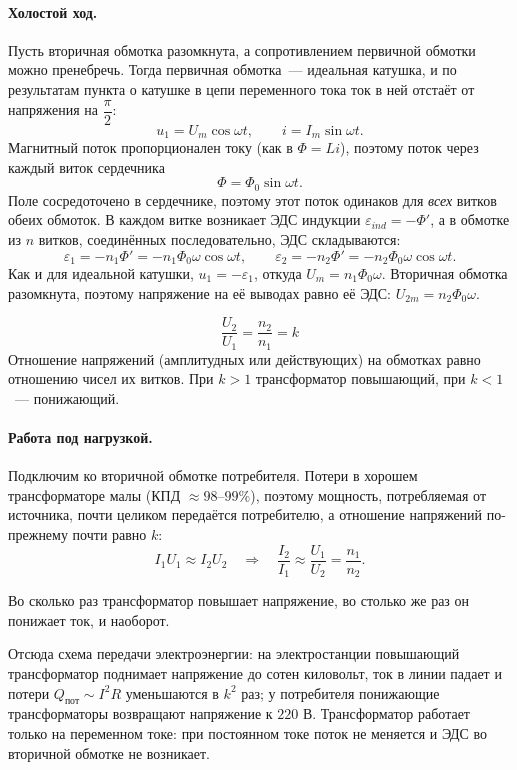 \documentclass[12pt]{article}
\begin{document}
	\paragraph{Холостой ход.}
	Пусть вторичная обмотка разомкнута, а сопротивлением первичной обмотки можно пренебречь. Тогда первичная обмотка~--- идеальная катушка, и по результатам пункта о катушке в цепи переменного тока ток в ней отстаёт от напряжения на $\dfrac{\pi}{2}$:
	\[
		u_1 = U_m \cos \omega t, \qquad i = I_m \sin \omega t.
	\]
	Магнитный поток пропорционален току (как в $\Phi = Li$), поэтому поток через каждый виток сердечника
	\[
		\Phi = \Phi_0 \sin \omega t.
	\]
	Поле сосредоточено в сердечнике, поэтому этот поток одинаков для \emph{всех} витков обеих обмоток. В каждом витке возникает ЭДС индукции $\varepsilon_{ind} = -\Phi'$, а в обмотке из $n$ витков, соединённых последовательно, ЭДС складываются:
	\[
		\varepsilon_1 = -n_1 \Phi' = -n_1 \Phi_0 \omega \cos \omega t, \qquad \varepsilon_2 = -n_2 \Phi' = -n_2 \Phi_0 \omega \cos \omega t.
	\]
	Как и для идеальной катушки, $u_1 = -\varepsilon_1$, откуда $U_m = n_1 \Phi_0 \omega$. Вторичная обмотка разомкнута, поэтому напряжение на её выводах равно её ЭДС: $U_{2m} = n_2 \Phi_0 \omega$.

	\begin{statement}
		\[
			\boxed{\dfrac{U_2}{U_1} = \dfrac{n_2}{n_1} = k}
		\]
		Отношение напряжений (амплитудных или действующих) на обмотках равно отношению чисел их витков. При $k > 1$ трансформатор повышающий, при $k < 1$~--- понижающий.
	\end{statement}

	\paragraph{Работа под нагрузкой.}
	Подключим ко вторичной обмотке потребителя. Потери в хорошем трансформаторе малы (КПД $\approx 98$--$99\%$), поэтому мощность, потребляемая от источника, почти целиком передаётся потребителю, а отношение напряжений по-прежнему почти равно $k$:
	\[
		I_1 U_1 \approx I_2 U_2 \quad \Longrightarrow \quad \dfrac{I_2}{I_1} \approx \dfrac{U_1}{U_2} = \dfrac{n_1}{n_2}.
	\]

	\begin{statement}
		Во сколько раз трансформатор повышает напряжение, во столько же раз он понижает ток, и наоборот.
	\end{statement}

	\begin{note}
		Отсюда схема передачи электроэнергии: на электростанции повышающий трансформатор поднимает напряжение до сотен киловольт, ток в линии падает и потери $Q_\text{пот} \sim I^2 R$ уменьшаются в $k^2$ раз; у потребителя понижающие трансформаторы возвращают напряжение к $220$ В. Трансформатор работает только на переменном токе: при постоянном токе поток не меняется и ЭДС во вторичной обмотке не возникает.
	\end{note}
\end{document}
